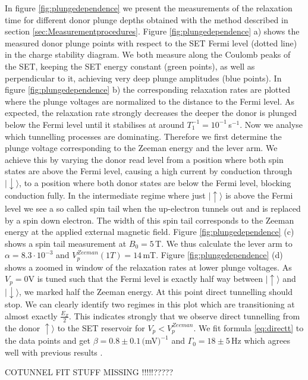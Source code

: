 \documentclass[%
 reprint,
 amsmath,amssymb,
 aps,
]{revtex4-1}
\newcommand {\ket} [1] {|{ #1 \rangle}}
\begin{document}
In figure \ref{fig:plungedependence} we present the measurements of the relaxation time for different donor plunge depths obtained with the method described in section \ref{sec:Measurementprocedures}. Figure \ref{fig:plungedependence} a) shows the measured donor plunge points with respect to the SET Fermi level (dotted line) in the charge stability diagram. We both measure along the Coulomb peaks of the SET, keeping the SET energy constant (green points), as well as perpendicular to it, achieving very deep plunge amplitudes (blue points). In figure \ref{fig:plungedependence} b) the corresponding relaxation rates are plotted where the plunge voltages are normalized to the distance to the Fermi level. As expected, the relaxation rate strongly decreases the deeper the donor is plunged below the Fermi level until it stabilises at around $T_1^{-1}=10^{-1}\,$s$^{-1}$. Now we analyse which tunnelling processes are dominating. Therefore we first determine the plunge voltage corresponding to the Zeeman energy and the lever arm. We achieve this by varying the donor read level from a position where both spin states are above the Fermi level, causing a high current by conduction through $\ket{\downarrow}$, to a position where both donor states are below the Fermi level, blocking conduction fully. In the intermediate regime where just $\ket{\uparrow}$ is above the Fermi level we see a so called spin tail when the up-electron tunnels out and is replaced by a spin down electron. The width of this spin tail corresponds to the Zeeman energy at the applied external magnetic field. Figure \ref{fig:plungedependence} (c) shows a spin tail measurement at $B_0=5\,$T. We thus calculate the lever arm to $\alpha=8.3\cdot 10^{-3}$ and $V_p^{Zeeman}(1T)=14\,$mT. Figure \ref{fig:plungedependence} (d) shows a zoomed in window of the relaxation rates at lower plunge voltages. As $V_p=0$V is tuned such that the Fermi level is exactly half way between $\ket{\uparrow}$ and $\ket{\downarrow}$, we marked half the Zeeman energy. At this point direct tunnelling should stop. We can clearly identify two regimes in this plot which are transitioning at almost exactly $\frac{E_Z}{2}$. This indicates strongly that we observe direct tunnelling from the donor $\uparrow\rangle$ to the SET reservoir for $V_p<V_p^{Zeeman}$. We fit formula \ref{eq:directt} to the data points and get $\beta = 0.8\pm0.1\,($mV$)^{-1}$ and $\Gamma_0=18\pm5\,$Hz which agrees well with previous results \cite{Amasha2008, MacLean2007}.

COTUNNEL FIT STUFF MISSING !!!!!?????
\end{document}
